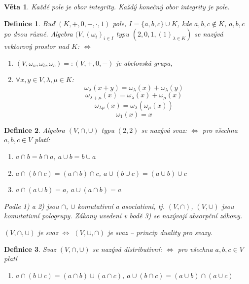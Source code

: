 \documentclass[a4paper, 11pt]{report}
\newtheorem{mydef}{Definice}[chapter]
\newtheorem{veta}{Věta}
\begin{document}
\begin{veta}
Každé \emph{pole} je \emph{obor integrity}. Každý konečný obor integrity je pole.
\end{veta}

\begin{mydef}
Buď $(K, +, 0, -, \cdot, 1)$ pole, $I = \{a, b, c\} \cup K$, kde $a,b,c \not\in K$, $a,b,c$ po dvou různé. Algebra $(V, (\omega_i)_{i \in I}$ typu $(2, 0, 1, (1)_{\lambda \in K})$ se nazývá vektorový prostor nad $K$: $\Leftrightarrow$
\begin{enumerate}[1)]
	\item $(V, \omega_a, \omega_b, \omega_c) =: (V, +, 0, -)$ je abelovská grupa,
	\item $\forall x,y \in V, \lambda, \mu \in K$:\\
	$$\omega_\lambda(x + y) = \omega_\lambda(x) + \omega_\lambda(y) $$
	$$\omega_{\lambda + \mu}(x) = \omega_\lambda(x) + \omega_\mu(x) $$
	$$\omega_{\lambda \mu}(x) = \omega_\lambda( \omega_\mu(x)) $$
	$$\omega_1(x) = x $$
\end{enumerate}
\end{mydef}

\begin{mydef}
Algebra $(V, \cap, \cup)$ typu $(2, 2)$ se nazývá \emph{svaz}: $\Leftrightarrow$ pro všechna $a,b,c \in V$ platí:
\begin{enumerate}[1)]
	\item $a \cap b = b \cap a$,
		$a \cup b = b \cup a$
	\item $a \cap (b \cap c) = (a \cap b) \cap c$,
		$a \cup (b \cup c) = (a \cup b) \cup c$
	\item $a \cap (a \cup b) = a$,
		$a \cup (a \cap b) = a$
\end{enumerate}
Podle 1) a 2) jsou $\cap$, $\cup$ komutativní a asociativní, tj. $(V, \cap)$, $(V, \cup)$ jsou komutativní pologrupy. Zákony uvedení v bodě 3) se nazývají absorpční zákony.

$(V, \cap, \cup)$ je svaz $\Leftrightarrow$ $(V, \cup, \cap)$ je svaz -- princip duality pro svazy.
\end{mydef}

\begin{mydef}
Svaz $(V, \cap, \cup)$ se nazývá distributivní: $\Leftrightarrow$ pro všechna $a, b, c \in V$ platí 
\begin{enumerate}[4)]
	\item $a \cap (b \cup c) = (a \cap b) \cup (a \cap c)$,
		$a \cup (b \cap c) = (a \cup b) \cap (a \cup c)$
\end{enumerate}
\end{mydef}
\end{document}
